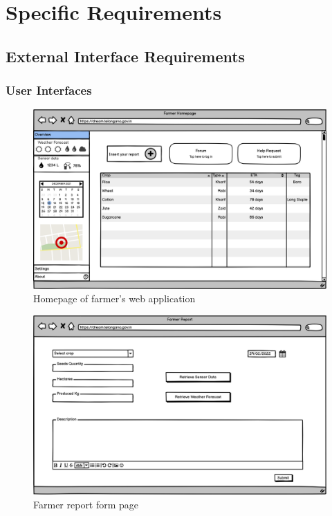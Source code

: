 \documentclass[10pt]{article}
\begin{document}
\section{Specific Requirements}
\subsection{External Interface Requirements}
\subsubsection{User Interfaces}
    \begin{figure}[h]
    \includegraphics[width=14cm]{farmer_homepage.png} 
    \caption{Homepage of farmer's web application} 
    \end{figure}
    \newpage
    \begin{figure}[ht]
    \includegraphics[width=14cm]{report.png}  
    \caption{Farmer report form page}
    \end{figure}
\end{document}
